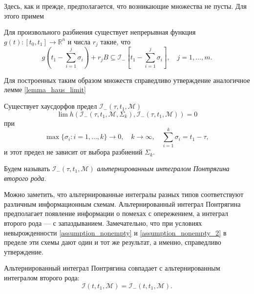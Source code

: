 Здесь, как и прежде, предполагается, что возникающие множества не пусты. Для этого примем
\begin{assumption}\label{assumption_nonempty_2}
    Для произвольного разбиения существует непрерывная функция \( g(t) : [t_0, t_1] \to \mathbb{R}^n \)
     и числа \( r_j \) такие, что
    \begin{equation*}
        g \left(t_1 - \sum_{i = 1}^j \sigma_i \right) + r_j B \subseteq \mathcal{I}_-\left[ t_1 - 
         \sum_{i = 1}^j \sigma_i \right], \quad j = 1, \dots, m.
    \end{equation*}
\end{assumption}

Для построенных таким образом множеств справедливо утверждение аналогичное лемме \eqref{lemma_haus_limit}

\begin{lemma}
    Существует хаусдорфов предел \( \mathcal{I}_-(\tau, t_1, \mathcal{M}) \)
    \[
        \lim h \left( \mathcal{I}_-(\tau, t_1, \mathcal{M}, \Sigma_k), \mathcal{I}_-(\tau, t_1,
         \mathcal{M}) \right) = 0    
    \]
    при
    \[
        \max\{\sigma_i : i = 1, \dots, k \} \to 0, \quad k \to \infty, \quad \sum_{i = 1}^k 
         \sigma_i = t_1 - \tau,
    \]
    и этот предел не зависит от выбора разбиений \( \Sigma_k \).
\end{lemma}

Будем называть \( \mathcal{I}_-(\tau, t_1, \mathcal{M}) \) \emph{альтернированным 
 интегралом Понтрягина второго рода}.

Можно заметить, что альтернированные интегралы разных типов соответствуют различным 
 информационным схемам. Альтернированный интеграл Понтрягина предполагает появление 
 информации о помехах с опережением, а интеграл второго рода --- с запаздыванием. 
 Замечательно, что при условиях невырожденности \eqref{assumption_nonempty} и 
 \eqref{assumption_nonempty_2} в пределе эти схемы дают один и тот же результат, а именно,
 справедливо утверждение.

\begin{theorem}
    Альтернированный интеграл Понтрягина совпадает с альтернированным интегралом второго рода:
    \begin{equation*}
        \mathcal{I}(t, t_1, \mathcal{M}) = \mathcal{I}_-(t, t_1, \mathcal{M}).
    \end{equation*}
\end{theorem}

